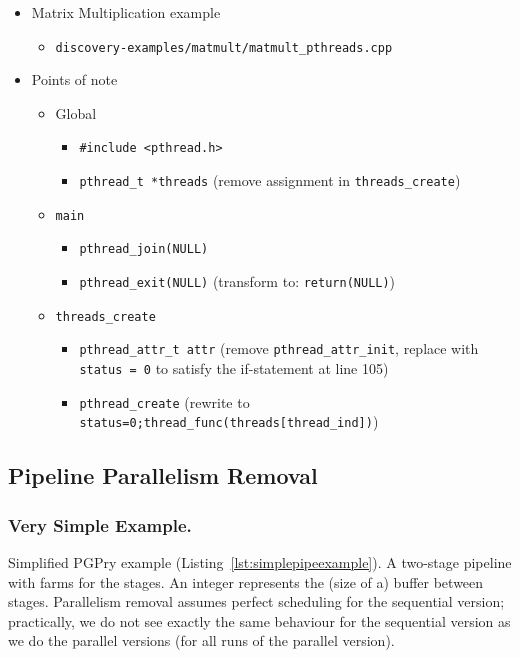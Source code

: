 \documentclass{llncs}
\begin{document}
\begin{itemize}
\item Matrix Multiplication example
  \begin{itemize}
  \item \texttt{discovery-examples/matmult/matmult\_pthreads.cpp}
  \end{itemize}
\item Points of note
  \begin{itemize}
  \item Global
    \begin{itemize}
    \item \lstinline|#include <pthread.h>|
    \item \lstinline|pthread_t *threads| (remove assignment in \lstinline|threads_create|)
    \end{itemize}
  \item \lstinline|main|
    \begin{itemize}
    \item \lstinline|pthread_join(NULL)|
    \item \lstinline|pthread_exit(NULL)| (transform to: \lstinline|return(NULL)|)
    \end{itemize}
  \item \lstinline|threads_create|
    \begin{itemize}
    \item \lstinline|pthread_attr_t attr| (remove \lstinline|pthread_attr_init|, replace with \lstinline|status = 0| to satisfy the if-statement at line 105)
    \item \lstinline|pthread_create| (rewrite to \lstinline|status=0;thread_func(threads[thread_ind])|)
    \end{itemize}
  \end{itemize}
\end{itemize}

\subsection{Pipeline Parallelism Removal}



\subsubsection{Very Simple Example.}

Simplified PGPry example (Listing~\ref{lst:simplepipeexample}). A two-stage pipeline with farms for the stages. An integer represents the (size of a) buffer between stages. Parallelism removal assumes perfect scheduling for the sequential version; practically, we do not see exactly the same behaviour for the sequential version as we do the parallel versions (for all runs of the parallel version).
\end{document}
